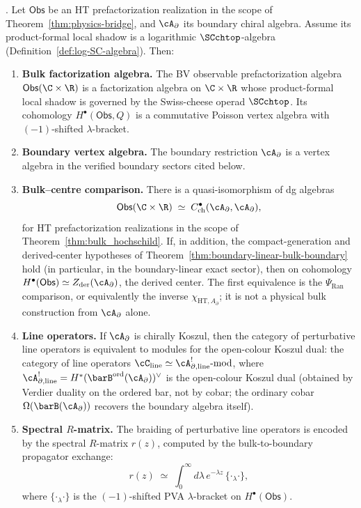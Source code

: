 \begin{theorem}%
\label{thm:bulk-boundary-line-factorization}
\ClaimStatusConditional.
Let $\mathsf{Obs}$ be an HT prefactorization realization in the
scope of Theorem~\ref{thm:physics-bridge}, and $\cA_\partial$ its
boundary chiral algebra. Assume its
product-formal local shadow is a logarithmic $\SCchtop$-algebra
\textup{(}Definition~\textup{\ref{def:log-SC-algebra})}.
Then:
\begin{enumerate}[label=\textup{(\roman*)}]
\item \textbf{Bulk factorization algebra.}
The BV observable prefactorization algebra
$\mathsf{Obs}(\C \times \R)$ is a factorization algebra on
$\C \times \R$ whose product-formal local shadow is governed by
the Swiss-cheese operad $\SCchtop$.
Its cohomology $H^\bullet(\mathsf{Obs}, Q)$ is a commutative
Poisson vertex algebra with $(-1)$-shifted $\lambda$-bracket.

\item \textbf{Boundary vertex algebra.}
The boundary restriction $\cA_\partial$ is a vertex algebra in the
verified boundary sectors cited below.

\item \textbf{Bulk--centre comparison.}
There is a quasi-isomorphism of dg algebras
\[
\mathsf{Obs}(\C \times \R)
\;\simeq\;
C^\bullet_{\mathrm{ch}}(\cA_\partial, \cA_\partial),
\]
for HT prefactorization realizations in the scope of
Theorem~\ref{thm:bulk_hochschild}. If, in addition, the
compact-generation and derived-center hypotheses of
Theorem~\ref{thm:boundary-linear-bulk-boundary} hold
\textup{(}in particular, in the boundary-linear exact sector\textup{)},
then on cohomology
$H^\bullet(\mathsf{Obs}) \simeq Z_{\mathrm{der}}(\cA_\partial)$,
the derived center. The first equivalence is the
\(\Psi_{\mathrm{Ran}}\) comparison, or equivalently the inverse
\(\chi_{\mathrm{HT},A_\partial}\); it is not a physical bulk
construction from \(\cA_\partial\) alone.

\item \textbf{Line operators.}
If\/ $\cA_\partial$ is chirally Koszul, then the category of perturbative line operators
is equivalent to modules for the open-colour Koszul dual:
the category of line operators
$\cC_{\mathrm{line}} \simeq \cA_{\partial,\mathrm{line}}^!\text{-}\mathrm{mod}$,
where $\cA_{\partial,\mathrm{line}}^! =
H^*(\barB^{\mathrm{ord}}(\cA_\partial))^\vee$ is the open-colour
Koszul dual \textup{(}obtained by Verdier duality on the ordered
bar, not by cobar; the ordinary cobar $\Omega(\barB(\cA_\partial))$
recovers the boundary algebra itself\textup{)}.

\item \textbf{Spectral $R$-matrix.}
The braiding of perturbative line operators is encoded by the spectral
$R$-matrix $r(z)$, computed by the bulk-to-boundary
propagator exchange:
\[
r(z) \;\simeq\; \int_0^\infty d\lambda\, e^{-\lambda z}\,
\{{\cdot}{}_\lambda{\cdot}\},
\]
where $\{{\cdot}{}_\lambda{\cdot}\}$ is the $(-1)$-shifted
PVA $\lambda$-bracket on $H^\bullet(\mathsf{Obs})$.
\end{enumerate}
\end{theorem}

